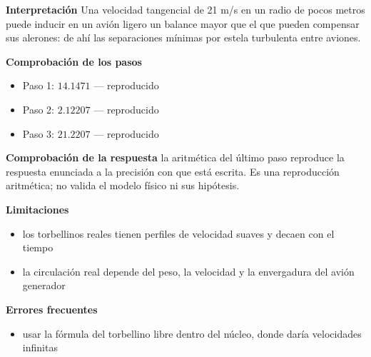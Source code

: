 \documentclass[10pt,openany]{book}
\begin{document}
\begin{tcolorbox}[title={Problema resuelto}, studiumworked, breakable]
\noindent\textbf{Interpretación}
Una velocidad tangencial de 21 m/s en un radio de pocos metros puede inducir en un avión ligero un balance mayor que el que pueden compensar sus alerones: de ahí las separaciones mínimas por estela turbulenta entre aviones.

\noindent\textbf{Comprobación de los pasos}
\begin{itemize}
\item Paso 1: $14.1471$ — reproducido
\item Paso 2: $2.12207$ — reproducido
\item Paso 3: $21.2207$ — reproducido
\end{itemize}

\noindent\textbf{Comprobación de la respuesta} la aritmética del último paso reproduce la respuesta enunciada a la precisión con que está escrita. Es una reproducción aritmética; no valida el modelo físico ni sus hipótesis.

\noindent\textbf{Limitaciones}
\begin{itemize}
\item los torbellinos reales tienen perfiles de velocidad suaves y decaen con el tiempo
\item la circulación real depende del peso, la velocidad y la envergadura del avión generador
\end{itemize}

\noindent\textbf{Errores frecuentes}
\begin{itemize}
\item usar la fórmula del torbellino libre dentro del núcleo, donde daría velocidades infinitas
\end{itemize}
\end{tcolorbox}
\end{document}
